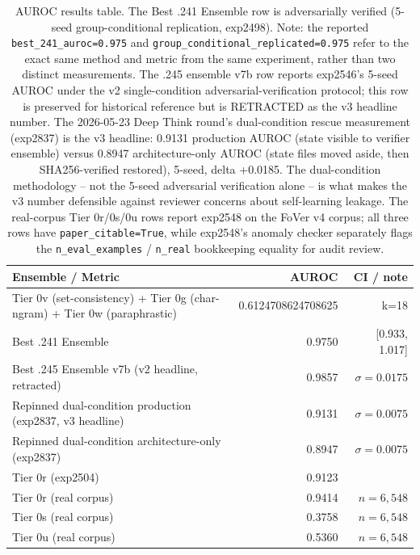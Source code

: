 \documentclass[10pt]{article}
\begin{document}
\begin{table}[ht]
  \centering
  \begin{tabular}{lrr}
    \toprule
    Ensemble / Metric & AUROC & CI / note \\
    \midrule
    Tier 0v (set-consistency) + Tier 0g (char-ngram) + Tier 0w (paraphrastic) & 0.6124708624708625 & k=18 \\
    Best .241 Ensemble & 0.9750 & [0.933, 1.017] \\
    Best .245 Ensemble v7b (v2 headline, retracted) & 0.9857 & $\sigma=0.0175$ \\
    Repinned dual-condition production (exp2837, v3 headline) & 0.9131 & $\sigma=0.0075$ \\
    Repinned dual-condition architecture-only (exp2837) & 0.8947 & $\sigma=0.0075$ \\
    Tier 0r (exp2504) & 0.9123 & \\
    Tier 0r (real corpus) & 0.9414 & $n=6{,}548$ \\
    Tier 0s (real corpus) & 0.3758 & $n=6{,}548$ \\
    Tier 0u (real corpus) & 0.5360 & $n=6{,}548$ \\
    \bottomrule
  \end{tabular}
  \caption{AUROC results table. The Best .241 Ensemble row is adversarially verified (5-seed group-conditional replication, exp2498). Note: the reported \texttt{best\_241\_auroc=0.975} and \texttt{group\_conditional\_replicated=0.975} refer to the exact same method and metric from the same experiment, rather than two distinct measurements. The .245 ensemble v7b row reports exp2546's 5-seed AUROC under the v2 single-condition adversarial-verification protocol; this row is preserved for historical reference but is RETRACTED as the v3 headline number. The 2026-05-23 Deep Think round's dual-condition rescue measurement (exp2837) is the v3 headline: 0.9131 production AUROC (state visible to verifier ensemble) versus 0.8947 architecture-only AUROC (state files moved aside, then SHA256-verified restored), 5-seed, delta +0.0185. The dual-condition methodology -- not the 5-seed adversarial verification alone -- is what makes the v3 number defensible against reviewer concerns about self-learning leakage. The real-corpus Tier 0r/0s/0u rows report exp2548 on the FoVer v4 corpus; all three rows have \texttt{paper\_citable=True}, while exp2548's anomaly checker separately flags the \texttt{n\_eval\_examples} / \texttt{n\_real} bookkeeping equality for audit review.}
  \label{tab:auroc-results}
\end{table}
\end{document}
